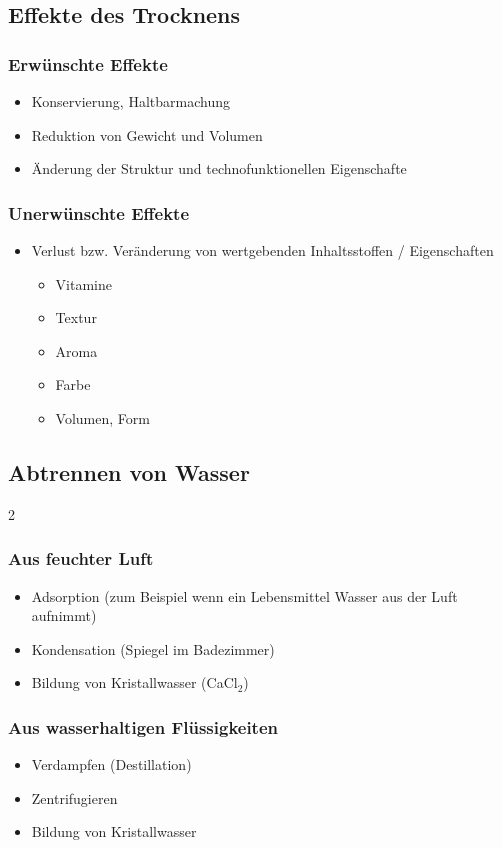 \documentclass[a4paper,10pt]{article}
\begin{document}
\subsection{Effekte des Trocknens}
\subsubsection{Erwünschte Effekte}
\begin{itemize}
\item Konservierung, Haltbarmachung
\item Reduktion von Gewicht und Volumen
\item Änderung der Struktur und technofunktionellen Eigenschafte
\end{itemize}

\subsubsection{Unerwünschte Effekte}
\begin{itemize}
\item Verlust bzw. Veränderung von wertgebenden Inhaltsstoffen / Eigenschaften
\begin{itemize}
\item Vitamine
\item Textur
\item Aroma
\item Farbe
\item Volumen, Form
\end{itemize}
\end{itemize}

\subsection{Abtrennen von Wasser}

\begin{multicols}{2}

\subsubsection{Aus feuchter Luft}
\begin{itemize}
\item Adsorption (zum Beispiel wenn ein Lebensmittel Wasser aus der Luft aufnimmt)
\item Kondensation (Spiegel im Badezimmer)
\item Bildung von Kristallwasser (CaCl$_2$)
\end{itemize}

\columnbreak
\subsubsection{Aus wasserhaltigen Flüssigkeiten}
\begin{itemize}
\item Verdampfen (Destillation)
\item Zentrifugieren
\item Bildung von Kristallwasser
\end{itemize}
\end{multicols}
\end{document}
